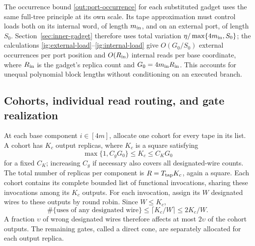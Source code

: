 The occurrence bound \eqref{out:port-occurrence} for each substituted
gadget uses the same full-tree principle at its own scale. Its tape
approximation must control loads both on its internal word, of length
$m_{\rm in}$, and on an external port, of length $S_0$. Section~\ref{sec:inner-gadget}
therefore uses total variation $\eta/\max\{4m_{\rm in},S_0\}$; the
calculations \eqref{ig:external-load}--\eqref{ig:internal-load} give
$O(G_0/S_0)$ external occurrences per port position and $O(R_{\rm in})$
internal reads per base coordinate, where $R_{\rm in}$ is the gadget's
replica count and $G_0=4m_{\rm in}R_{\rm in}$.
This accounts for unequal polynomial block lengths without conditioning
on an executed branch.

\subsection{Cohorts, individual read routing, and gate realization}

At each base component $i\in[4m]$, allocate one cohort for every tape in
its list. A cohort has $K_c$ output replicas, where $K_c$ is a square
satisfying
\begin{equation}\label{out:cohort-size}
 \max\{1,C_gG_0\}\leq K_c\leq C_KG_0
\end{equation}
for a fixed $C_K$; increasing $C_g$ if necessary also covers all
designated-wire counts. The total number of replicas per component is
$R=T_{\rm tap}K_c$, again a square. Each cohort contains its complete
bounded list of functional invocations, sharing these invocations
among its $K_c$ outputs. For each invocation, assign its $W$ designated
wires to these outputs by round robin. Since $W\leq K_c$,
\begin{equation}\label{out:round-robin}
 \#\{\text{uses of any designated wire}\}
 \leq\lceil K_c/W\rceil\leq 2K_c/W.
\end{equation}
A fraction $\upsilon$ of wrong designated wires therefore affects at
most $2\upsilon$ of the cohort outputs. The remaining gates, called a
direct cone, are separately allocated for each output replica.

